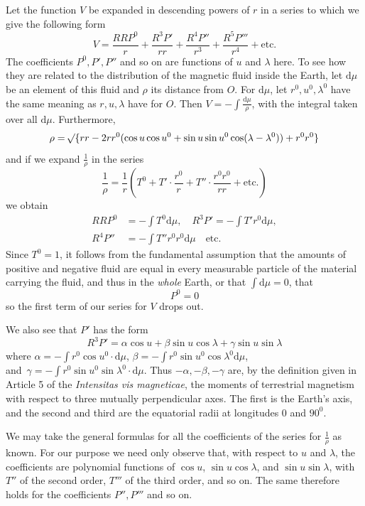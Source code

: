 Let the function $V$ be expanded in descending powers of $r$ in a series to which we give the following form
\[
V=\frac{RRP^0}{r}+\frac{R^3P'}{rr}+\frac{R^4P''}{r^3}+\frac{R^5P'''}{r^4}+\text{etc.}
\]
The coefficients $P^0,P',P''$ and so on are functions of $u$ and $\lambda$ here. To see how they are related to the distribution of the magnetic fluid inside the Earth, let $\mathrm{d}\mu$ be an element of this fluid and $\rho$ its distance from $O$. For $\mathrm{d}\mu$, let $r^0,u^0,\lambda^0$ have the same meaning as $r,u,\lambda$ have for $O$. Then $V=-\int\frac{\mathrm{d}\mu}{\rho}$, with the integral taken over all $\mathrm{d}\mu$. Furthermore,
\[
\rho=\mathord{{}^{}\!\surd}\{rr-2rr^0(\cos u\cos u^0+\sin u\sin u^0\cos(\lambda-\lambda^0))+r^0r^0\}
\]
and if we expand $\frac1\rho$ in the series
\[
\frac1\rho=\frac1r(T^0+T'\cdot\frac{r^0}{r}+T''\cdot\frac{r^0r^0}{rr}+\text{etc.})
\]
we obtain
\[
\begin{aligned}RRP^0&=-\int T^0\mathrm{d}\mu,\quad R^3P'=-\int T'r^0\mathrm{d}\mu,\\R^4P''&=-\int T''r^0r^0\mathrm{d}\mu\quad\text{etc.}\end{aligned}
\]
Since $T^0=1$, it follows from the fundamental assumption that the amounts of positive and negative fluid are equal in every measurable particle of the material carrying the fluid, and thus in the \textit{whole} Earth, or that $\int\mathrm{d}\mu=0$, that
\[
P^0=0
\]
so the first term of our series for $V$ drops out.

We also see that $P'$ has the form
\[
R^3P'=\alpha\cos u+\beta\sin u\cos\lambda+\gamma\sin u\sin\lambda
\]
where $\alpha=-\int r^0\cos u^0\cdot\mathrm{d}\mu$, $\beta=-\int r^0\sin u^0\cos\lambda^0\mathrm{d}\mu$,\\
and~\mbox{$\gamma=-\int r^0\sin u^0\sin\lambda^0\cdot\mathrm{d}\mu$}. Thus $-\alpha,-\beta,-\gamma$ are, by the definition given in Article 5 of the \textit{Intensitas vis magneticae}, the moments of terrestrial magnetism with respect to three mutually perpendicular axes. The first is the Earth's axis, and the second and third are the equatorial radii at longitudes $0$ and $90^0$.

We may take the general formulas for all the coefficients of the series for $\frac1\rho$ as known. For our purpose we need only observe that, with respect to $u$ and $\lambda$, the coefficients are polynomial functions of $\cos u$, $\sin u\cos\lambda$, and $\sin u\sin\lambda$, with $T''$ of the second order, $T'''$ of the third order, and so on. The same therefore holds for the coefficients $P'',P'''$ and so on.

